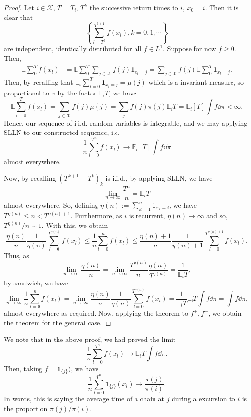 \documentclass[]{article}
\theoremstyle{definition}
\theoremstyle{definition}
\begin{document}
\begin{proof}
  Let \(i \in \mathcal{X}\), \(T = T_i\), \(T^k\) the successive return times to 
  \(i\), \(x_0 = i\). Then it is clear that 
  \[\left\{\sum_{l = T^k}^{T^{k + 1}}f(x_l), k = 0, 1, \cdots\right\}\]
  are independent, identically distributed for all \(f \in L^1\). Suppose for 
  now \(f \ge 0\). Then, 
  \[\begin{split}
    \mathbb{E} \sum_0^T f(x_l) 
    & = \mathbb{E} \sum_0^T \sum_{j \in \mathcal{X}} f(j)\mathbf{1}_{x_l = j}
      = \sum_{j \in \mathcal{X}} f(j)\mathbb{E}\sum_0^T \mathbf{1}_{x_l = j}.
  \end{split}\]
  Then, by recalling that \(\mathbb{E}_i \sum_{l = 0}^T \mathbf{1}_{x_l = j} = 
  \mu(j)\) which is a invariant measure, so proportional to \(\pi\) by the factor 
  \(\mathbb{E}_i T\), we have 
  \[\mathbb{E} \sum_{l = 0}^T f(x_l)  = \sum_{j \in \mathcal{X}}f(j) \mu(j) 
    = \sum_{j} f(j)\pi(j)\mathbb{E}_i T = \mathbb{E}_i[T]\int f \dd \pi < \infty.\]
  Hence, our sequence of i.i.d. random variables is integrable, and 
  we may applying SLLN to our constructed sequence, i.e. 
  \[\frac{1}{n}\sum_{l = 0}^{T^n}f(x_l) \to \mathbb{E}_i[T] \int f \dd \pi\]
  almost everywhere.

  Now, by recalling \((T^{k + 1} - T^k)_k\) is i.i.d., by applying SLLN, we have 
  \[\lim_{n \to \infty} \frac{T^n}{n} = \mathbb{E}_i T\]
  almost everywhere. So, defining \(\eta(n) := \sum_{k = 1}^n \mathbf{1}_{x_k = i}\), 
  we have \(T^{\eta(n)} \le n < T^{\eta(n) + 1}\). Furthermore, as \(i\) is recurrent,
  \(\eta(n) \to \infty\) and so, \(T^{\eta(n)} / n \sim 1\). With this, we obtain 
  \[\frac{\eta(n)}{n}\frac{1}{\eta(n)} \sum_{l = 0}^{T^{\eta(n)}}f(x_l) 
    \le \frac{1}{n}\sum_{l = 0}^n f(x_l) 
    \le \frac{\eta(n) + 1}{n}\frac{1}{\eta(n) + 1}\sum_{l = 0}^{T^{\eta(n) + 1}}f(x_l).\]
  Thus, as 
  \[\lim_{n \to \infty}\frac{\eta(n)}{n} = 
    \lim_{n \to \infty}\frac{T^{\eta(n)}}{n}\frac{\eta(n)}{T^{\eta(n)}} = 
    \frac{1}{\mathbb{E}_iT},\]
  by sandwich, we have 
  \[\lim_{n \to \infty} \frac{1}{n}\sum_{l = 0}^n f(x_l) = 
    \lim_{n \to \infty} \frac{\eta(n)}{n}\frac{1}{\eta(n)} \sum_{l = 0}^{T^{\eta(n)}}f(x_l) 
    = \frac{1}{\mathbb{E}_i T} \mathbb{E_i}T \int f \dd \pi = \int f \dd \pi,\]
  almost everywhere as required. Now, applying the theorem to \(f^+, f^-\), we 
  obtain the theorem for the general case.
\end{proof}

We note that in the above proof, we had proved the limit 
\[\frac{1}{n}\sum_{l = 0}^{T^n} f(x_l) \to \mathbb{E}_i T \int f \dd \pi.\]
Then, taking \(f = \mathbf{1}_{\{j\}})\), we have 
\[\frac{1}{n}\sum_{l = 0}^{T^n}\mathbf{1}_{\{j\}}(x_l) \to \frac{\pi(j)}{\pi(i)}.\]
In words, this is saying the average time of a chain at \(j\) during a excursion 
to \(i\) is the proportion \(\pi(j) / \pi(i)\).
\end{document}

